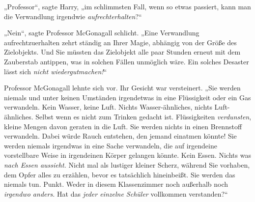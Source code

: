 „Professor“, sagte Harry, „im schlimmsten Fall, wenn so etwas passiert, kann man die Verwandlung irgendwie \emph{aufrechterhalten}?“

„Nein“, sagte Professor McGonagall schlicht. „Eine Verwandlung aufrechtzuerhalten zehrt ständig an Ihrer Magie, abhängig von der Größe des Zielobjekts. Und Sie müssten das Zielobjekt alle paar Stunden erneut mit dem Zauberstab antippen, was in solchen Fällen unmöglich wäre. Ein solches Desaster lässt sich \emph{nicht wiedergutmachen!}“

Professor McGonagall lehnte sich vor. Ihr Gesicht war versteinert. „Sie werden niemals und unter keinen Umständen irgendetwas in eine Flüssigkeit oder ein Gas verwandeln. Kein Wasser, keine Luft. Nichts Wasser-ähnliches, nichts Luft-ähnliches. Selbst wenn es nicht zum Trinken gedacht ist. Flüssigkeiten \emph{verdunsten}, kleine Mengen davon geraten in die Luft. Sie werden nichts in einen Brennstoff verwandeln. Dabei würde Rauch entstehen, den jemand einatmen könnte! Sie werden niemals irgendwas in eine Sache verwandeln, die auf irgendeine vorstellbare Weise in irgendeinen Körper gelangen könnte. Kein Essen. Nichts was \emph{nach Essen aussieht.} Nicht mal als lustiger kleiner Scherz, während Sie vorhaben, dem Opfer alles zu erzählen, bevor es tatsächlich hineinbeißt. Sie werden das niemals tun. Punkt. Weder in diesem Klassenzimmer noch außerhalb noch \emph{irgendwo anders.} Hat das \emph{jeder einzelne Schüler} vollkommen verstanden?“

